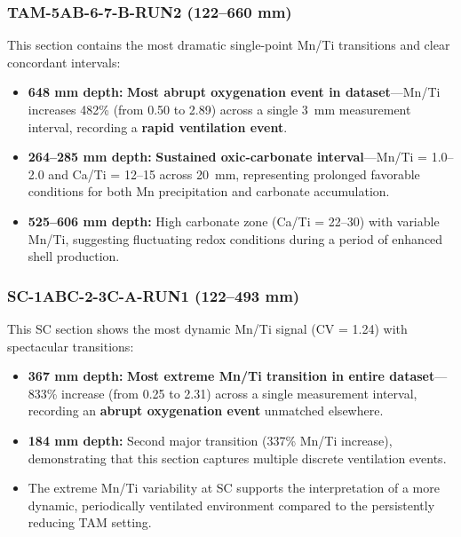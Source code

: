 \subsubsection{TAM-5AB-6-7-B-RUN2 (122--660 mm)}

This section contains the most dramatic single-point Mn/Ti transitions and clear concordant intervals:

\begin{itemize}
\item \textbf{648 mm depth:} \textbf{Most abrupt oxygenation event in dataset}---Mn/Ti increases 482\% (from 0.50 to 2.89) across a single 3~mm measurement interval, recording a \textbf{rapid ventilation event}.

\item \textbf{264--285 mm depth:} \textbf{Sustained oxic-carbonate interval}---Mn/Ti = 1.0--2.0 and Ca/Ti = 12--15 across 20~mm, representing prolonged favorable conditions for both Mn precipitation and carbonate accumulation.

\item \textbf{525--606 mm depth:} High carbonate zone (Ca/Ti = 22--30) with variable Mn/Ti, suggesting fluctuating redox conditions during a period of enhanced shell production.
\end{itemize}

\subsubsection{SC-1ABC-2-3C-A-RUN1 (122--493 mm)}

This SC section shows the most dynamic Mn/Ti signal (CV = 1.24) with spectacular transitions:

\begin{itemize}
\item \textbf{367 mm depth:} \textbf{Most extreme Mn/Ti transition in entire dataset}---833\% increase (from 0.25 to 2.31) across a single measurement interval, recording an \textbf{abrupt oxygenation event} unmatched elsewhere.

\item \textbf{184 mm depth:} Second major transition (337\% Mn/Ti increase), demonstrating that this section captures multiple discrete ventilation events.

\item The extreme Mn/Ti variability at SC supports the interpretation of a more dynamic, periodically ventilated environment compared to the persistently reducing TAM setting.
\end{itemize}

